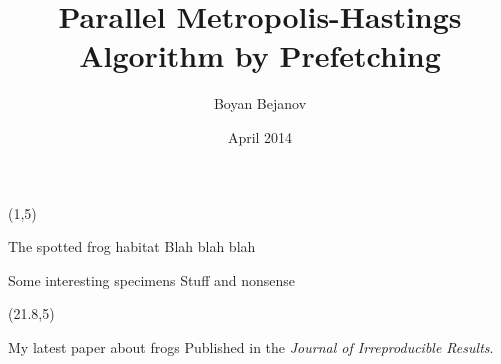 \documentclass[final]{beamer}
\title{Parallel Metropolis-Hastings Algorithm by Prefetching}
\author{Boyan Bejanov}
\institute{Banc of Canada \\ Carleton University}
\date{April 2014}
\begin{document}
\begin{frame}{} 

\begin{textblock}{19.5}(1,5)
\begin{block}{The spotted frog habitat}
Blah blah blah
\end{block}

\begin{block}{Some interesting specimens}
Stuff and nonsense
\end{block}
\end{textblock}

\begin{textblock}{19.3}(21.8,5)
\begin{block}{My latest paper about frogs}
Published in the \emph{Journal of Irreproducible Results}.
\end{block}

\end{textblock}

\end{frame}
\end{document}
